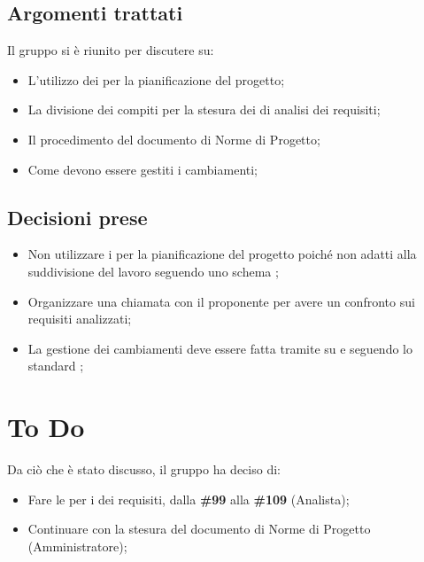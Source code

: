 \documentclass[a4paper, 12pt]{article}
\begin{document}
\subsection{Argomenti trattati}
Il gruppo si è riunito per discutere su:
\begin{itemize}
    \item L'utilizzo dei  per la pianificazione del progetto;
    \item La divisione dei compiti per la stesura dei  di analisi dei requisiti;
    \item Il procedimento del documento di Norme di Progetto;
    \item Come devono essere gestiti i cambiamenti;
\end{itemize}

\subsection{Decisioni prese}
\begin{itemize}
    \item Non utilizzare i  per la pianificazione del progetto poiché non adatti alla suddivisione del lavoro seguendo uno schema ;
    \item Organizzare una chiamata con il proponente per avere un confronto sui requisiti analizzati;
    \item La gestione dei cambiamenti deve essere fatta tramite  su  e seguendo lo standard ;
\end{itemize}

\section{To Do}
Da ciò che è stato discusso, il gruppo ha deciso di:
\begin{itemize}
    \item Fare le  per i  dei requisiti, dalla \textbf{\#99} alla \textbf{\#109} (Analista);
    \item Continuare con la stesura del documento di Norme di Progetto (Amministratore);
\end{itemize}
\end{document}
